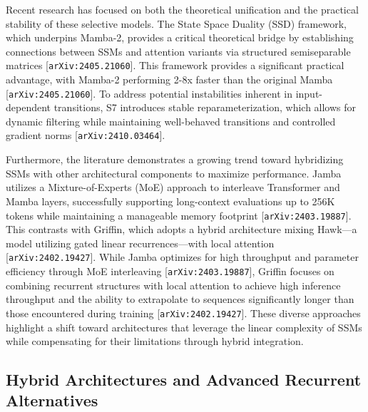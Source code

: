 \documentclass[11pt]{article}
\begin{document}
Recent research has focused on both the theoretical unification and the practical stability of these selective models. The State Space Duality (SSD) framework, which underpins Mamba-2, provides a critical theoretical bridge by establishing connections between SSMs and attention variants via structured semiseparable matrices [\texttt{arXiv:2405.21060}]. This framework provides a significant practical advantage, with Mamba-2 performing 2-8x faster than the original Mamba [\texttt{arXiv:2405.21060}]. To address potential instabilities inherent in input-dependent transitions, S7 introduces stable reparameterization, which allows for dynamic filtering while maintaining well-behaved transitions and controlled gradient norms [\texttt{arXiv:2410.03464}].

Furthermore, the literature demonstrates a growing trend toward hybridizing SSMs with other architectural components to maximize performance. Jamba utilizes a Mixture-of-Experts (MoE) approach to interleave Transformer and Mamba layers, successfully supporting long-context evaluations up to 256K tokens while maintaining a manageable memory footprint [\texttt{arXiv:2403.19887}]. This contrasts with Griffin, which adopts a hybrid architecture mixing Hawk—a model utilizing gated linear recurrences—with local attention [\texttt{arXiv:2402.19427}]. While Jamba optimizes for high throughput and parameter efficiency through MoE interleaving [\texttt{arXiv:2403.19887}], Griffin focuses on combining recurrent structures with local attention to achieve high inference throughput and the ability to extrapolate to sequences significantly longer than those encountered during training [\texttt{arXiv:2402.19427}]. These diverse approaches highlight a shift toward architectures that leverage the linear complexity of SSMs while compensating for their limitations through hybrid integration.

\subsection{Hybrid Architectures and Advanced Recurrent Alternatives}
\end{document}
